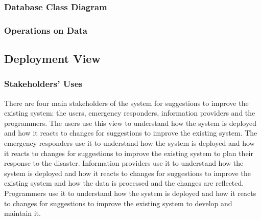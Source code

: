 \documentclass[a4paper]{article}
\begin{document}
    \subsubsection{Database Class Diagram}
    \subsubsection{Operations on Data}
    \begin{table}[H]
    \end{table}
    \vspace{1cm}
    \subsection{Deployment View}
    \subsubsection{Stakeholders' Uses}
    There are four main stakeholders of the system for suggestions to improve the existing system: the users, emergency responders,
    information providers and the programmers. The users use this view to understand how the system is deployed and how it reacts
    to changes for suggestions to improve the existing system. The emergency responders use it to understand how the system is
    deployed and how it reacts to changes for suggestions to improve the existing system to plan their response to the disaster.
    Information providers use it to understand how the system is deployed and how it reacts to changes for suggestions to improve
    the existing system and how the data is processed and the changes are reflected. Programmers use it to understand how the
    system is deployed and how it reacts to changes for suggestions to improve the existing system to develop and maintain it.
\end{document}
